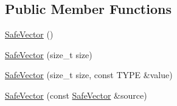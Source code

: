 \subsection*{Public Member Functions}
\begin{DoxyCompactItemize}
\item 
\hyperlink{class_p_r_o_b_c_o_n_s_1_1_safe_vector_aef43a7e3ed7d193e5ce49e7d20dde76e}{Safe\+Vector} ()
\item 
\hyperlink{class_p_r_o_b_c_o_n_s_1_1_safe_vector_aff7a5d7849d16d9732d94f889fc29b24}{Safe\+Vector} (size\+\_\+t size)
\item 
\hyperlink{class_p_r_o_b_c_o_n_s_1_1_safe_vector_a1ef5ac6bf30852aa0fc29efb872dbf3c}{Safe\+Vector} (size\+\_\+t size, const T\+Y\+P\+E \&value)
\item 
\hyperlink{class_p_r_o_b_c_o_n_s_1_1_safe_vector_ae98e75ee5d8849a8f9bcf5041eb96efa}{Safe\+Vector} (const \hyperlink{class_p_r_o_b_c_o_n_s_1_1_safe_vector}{Safe\+Vector} \&source)
\end{DoxyCompactItemize}


